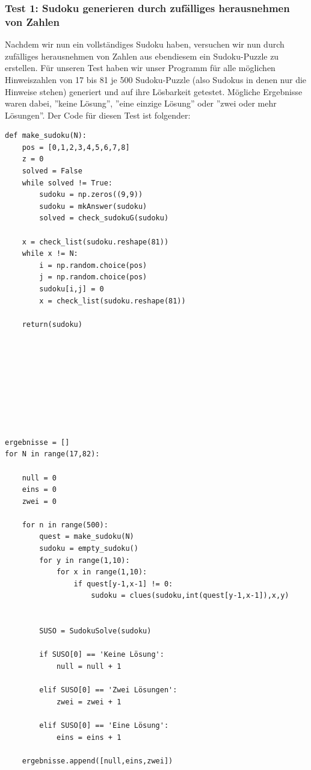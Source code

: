 \documentclass[11pt,a4paper]{article}
\begin{document}
\subsubsection{Test 1: Sudoku generieren durch zufälliges herausnehmen von Zahlen}
Nachdem wir nun ein vollständiges Sudoku haben, versuchen wir nun durch zufälliges herausnehmen von Zahlen aus ebendiesem ein Sudoku-Puzzle zu erstellen.
Für unseren Test haben wir unser Programm für alle möglichen Hinweiszahlen von 17 bis 81 je 500 Sudoku-Puzzle (also Sudokus in denen nur die Hinweise stehen) generiert und auf ihre Lösbarkeit getestet. Mögliche Ergebnisse waren dabei, ''keine Lösung'', ''eine einzige Lösung'' oder ''zwei oder mehr Lösungen''.
Der Code für diesen Test ist folgender:
\ \\
\begin{verbatim}
def make_sudoku(N):
    pos = [0,1,2,3,4,5,6,7,8]
    z = 0
    solved = False
    while solved != True:
        sudoku = np.zeros((9,9))
        sudoku = mkAnswer(sudoku)
        solved = check_sudokuG(sudoku)
    
    x = check_list(sudoku.reshape(81))
    while x != N:
        i = np.random.choice(pos)
        j = np.random.choice(pos)
        sudoku[i,j] = 0
        x = check_list(sudoku.reshape(81))
    
    return(sudoku)








    
ergebnisse = []                       
for N in range(17,82):                

    null = 0                         
    eins = 0                          
    zwei = 0                          
                              
    for n in range(500):              
        quest = make_sudoku(N)        
        sudoku = empty_sudoku()                                    
        for y in range(1,10):                                      
            for x in range(1,10):                                  
                if quest[y-1,x-1] != 0:                            
                    sudoku = clues(sudoku,int(quest[y-1,x-1]),x,y) 
        

        SUSO = SudokuSolve(sudoku)                                      
        
        if SUSO[0] == 'Keine Lösung':           
            null = null + 1                     
                                                
        elif SUSO[0] == 'Zwei Lösungen':        
            zwei = zwei + 1                     
                                                
        elif SUSO[0] == 'Eine Lösung':          
            eins = eins + 1                     
                         
    ergebnisse.append([null,eins,zwei]) 
            
\end{verbatim}
\end{document}
